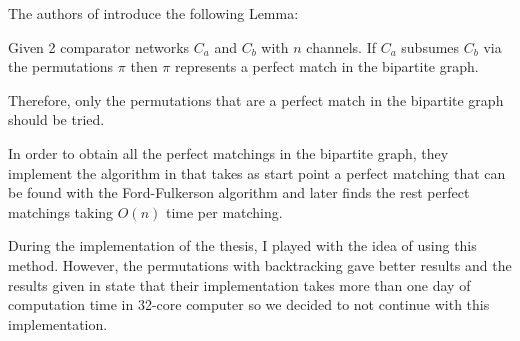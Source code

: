 \documentclass[../main.tex]{subfiles}
\begin{document}
	The authors of \cite{improvedSubsumption} introduce the following Lemma: 
	
	\begin{lemma}
		Given 2 comparator networks $C_a$ and $C_b$ with $n$ channels. If $C_a$ subsumes $C_b$ via the permutations $\pi$ then $\pi$ represents a perfect match in the bipartite graph.
	\end{lemma}

	Therefore, only the permutations that are a perfect match in the bipartite graph should be tried. 
	
	In order to obtain all the perfect matchings in the bipartite graph, they implement the algorithm in \cite{enumeratePerfectMatchings} that takes as start point a perfect matching that can be found with the Ford-Fulkerson algorithm and later finds the rest perfect matchings taking $O(n)$ time per matching.
	
	During the implementation of the thesis, I played with the idea of using this method. However, the permutations with backtracking gave better results and the results given in \cite{improvedSubsumption} state that their implementation takes more than one day of computation time in 32-core computer so we decided to not continue with this implementation.
	\newpage
\end{document}
